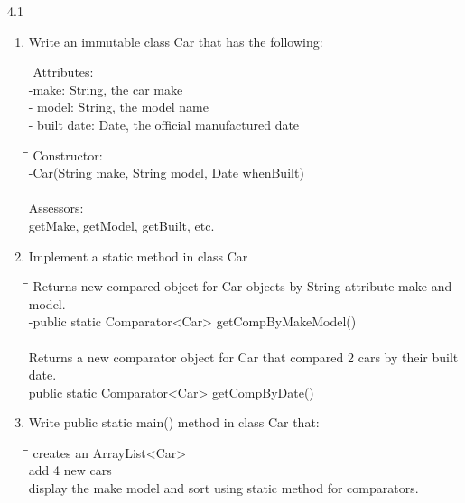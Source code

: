 4.1


\begin{enumerate}[label=(\alph*),align=left, wide, labelwidth=!, labelindent=0pt]
\item Write an immutable class Car that has the following:

\begin{tabbing}
\hspace*{5mm}\=\hspace*{10mm}\= \kill
Attributes:\\
\>-make: String, the car make\\
\>- model: String, the model name\\
\>- built date: Date, the official manufactured date\\
\end{tabbing}

\begin{tabbing}
\hspace*{5mm}\=\hspace*{10mm}\= \kill
Constructor:\\
\>-Car(String make, String model, Date whenBuilt)\\
\\
Assessors:\\
\>getMake, getModel, getBuilt, etc.\\
\end{tabbing}

\item Implement a static method in class Car

\begin{tabbing}
\hspace*{5mm}\=\hspace*{10mm}\= \kill
\> Returns new compared object for Car objects by String attribute make and model.\\
\>-public static Comparator<Car> getCompByMakeModel()\\
\\
\> Returns a new comparator object for Car that compared 2 cars by their built date.\\
\> public static Comparator<Car> getCompByDate()\\
\end{tabbing}

\item Write public static main() method in class Car that:

\begin{tabbing}
\hspace*{5mm}\=\hspace*{10mm}\= \kill
\> creates an ArrayList<Car> \\
\> add 4 new cars \\
\> display the make model and sort using static method for comparators.\\
\end{tabbing}


\end{enumerate}

